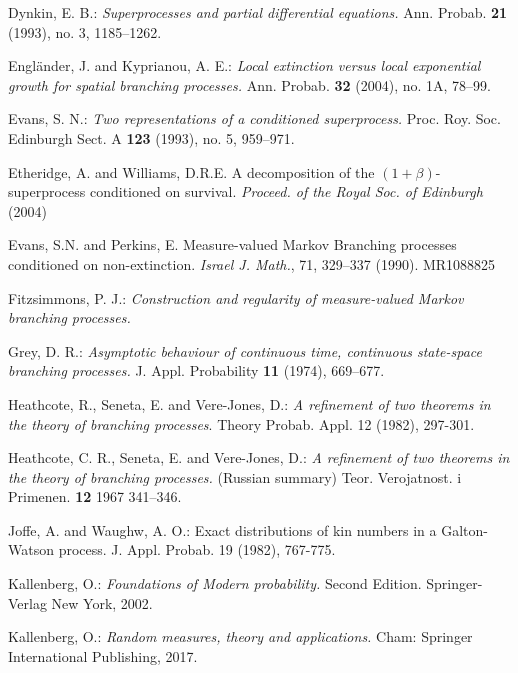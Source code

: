 \documentclass[12pt,a4paper]{amsart}
\numberwithin{equation}{section}
\theoremstyle{plain}
\theoremstyle{definition}
\theoremstyle{remark}
\begin{document}
\begin{thebibliography}{99}
Dynkin, E. B.:
\emph{Superprocesses and partial differential equations.}
Ann. Probab. \textbf{21} (1993), no. 3, 1185--1262.

Engl\"ander, J. and Kyprianou, A. E.:
\emph{Local extinction versus local exponential growth for spatial branching processes.}
Ann. Probab. \textbf{32} (2004), no. 1A, 78--99.

Evans, S. N.:
\emph{Two representations of a conditioned superprocess.}
Proc. Roy. Soc. Edinburgh Sect. A \textbf{123} (1993), no. 5, 959--971.

 Etheridge, A. and Williams, D.R.E. A decomposition of the $(1+\beta)$-superprocess conditioned on survival. \emph{Proceed. of the Royal Soc. of Edinburgh} (2004)

 Evans, S.N. and Perkins, E. Measure-valued Markov Branching processes conditioned on non-extinction. \emph{Israel J. Math.}, 71, 329--337 (1990). MR1088825


Fitzsimmons, P. J.:
\emph{Construction and regularity of measure-valued Markov branching processes.}

Grey, D. R.:
\emph{Asymptotic behaviour of continuous time, continuous state-space branching processes.}
J. Appl. Probability \textbf{11} (1974), 669--677.

Heathcote, R.,  Seneta, E.  and Vere-Jones, D.:
\emph{ A refinement of two theorems in the theory of branching processes}.
Theory Probab. Appl. 12 (1982), 297-301.

Heathcote, C. R., Seneta, E. and Vere-Jones, D.:
\emph{A refinement of two theorems in the theory of branching processes.} (Russian summary)
Teor. Verojatnost. i Primenen. \textbf{12} 1967 341--346.



Joffe, A. and Waughw, A. O.:  Exact distributions of kin numbers in a Galton-Watson
process. J. Appl. Probab. 19 (1982), 767-775.

	Kallenberg, O.:
	\emph{Foundations of Modern probability.}
	Second Edition.	Springer-Verlag New York, 2002.
	
	Kallenberg, O.:
	\emph{Random measures, theory and applications.}
	Cham: Springer International Publishing, 2017.


\end{thebibliography}
\end{document}
